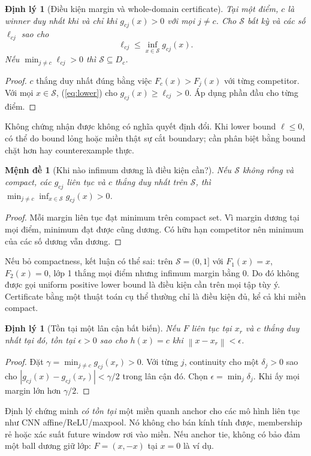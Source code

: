 \documentclass[11pt,a4paper]{article}
\newcommand{\norm}[1]{\left\lVert #1\right\rVert}
\newcommand{\Sset}{\mathcal S}
\newtheorem{theorem}[definition]{Định lý}
\newtheorem{proposition}[definition]{Mệnh đề}
\theoremstyle{remark}
\begin{document}
\begin{theorem}[Điều kiện margin và whole-domain certificate]
\label{th:margin}
Tại một điểm, $c$ là winner duy nhất khi và chỉ khi $g_{cj}(x)>0$ với mọi
$j\ne c$. Cho $\Sset$ bất kỳ và các số $\ell_{cj}$ sao cho
\begin{equation}
 \ell_{cj}\le\inf_{x\in\Sset}g_{cj}(x).
 \label{eq:lower}
\end{equation}
Nếu $\min_{j\ne c}\ell_{cj}>0$ thì $\Sset\subseteq D_c$.
\end{theorem}
\begin{proof}
$c$ thắng duy nhất đúng bằng việc $F_c(x)>F_j(x)$ với từng competitor.
Với mọi $x\in\Sset$, (\ref{eq:lower}) cho
$g_{cj}(x)\ge\ell_{cj}>0$. Áp dụng phần đầu cho từng điểm.
\end{proof}
Không chứng nhận được không có nghĩa quyết định đổi. Khi lower bound
$\ell\le0$, có thể do bound lỏng hoặc miền thật sự cắt boundary; cần phân
biệt bằng bound chặt hơn hay counterexample thực.

\begin{proposition}[Khi nào infimum dương là điều kiện cần?]
Nếu $\Sset$ không rỗng và compact, các $g_{cj}$ liên tục và $c$ thắng duy nhất trên
$\Sset$, thì $\min_{j\ne c}\inf_{x\in\Sset}g_{cj}(x)>0$.
\end{proposition}
\begin{proof}
Mỗi margin liên tục đạt minimum trên compact set. Vì margin dương tại mọi
điểm, minimum đạt được cũng dương. Có hữu hạn competitor nên minimum của
các số dương vẫn dương.
\end{proof}
Nếu bỏ compactness, kết luận có thể sai: trên $\Sset=(0,1]$ với
$F_1(x)=x$, $F_2(x)=0$, lớp 1 thắng mọi điểm nhưng infimum margin bằng 0.
Do đó không được gọi uniform positive lower bound là điều kiện cần trên
mọi tập tùy ý. Certificate bằng một thuật toán cụ thể thường chỉ là điều
kiện đủ, kể cả khi miền compact.

\begin{theorem}[Tồn tại một lân cận bất biến]\label{th:exist}
Nếu $F$ liên tục tại $x_r$ và $c$ thắng duy nhất tại đó, tồn tại
$\epsilon>0$ sao cho $h(x)=c$ khi $\norm{x-x_r}<\epsilon$.
\end{theorem}
\begin{proof}
Đặt $\gamma=\min_{j\ne c}g_{cj}(x_r)>0$. Với từng $j$, continuity cho một
$\delta_j>0$ sao cho $|g_{cj}(x)-g_{cj}(x_r)|<\gamma/2$ trong lân cận đó.
Chọn $\epsilon=\min_j\delta_j$. Khi ấy mọi margin lớn hơn $\gamma/2$.
\end{proof}
Định lý chứng minh \emph{có tồn tại} một miền quanh anchor cho các mô hình
liên tục như CNN affine/ReLU/maxpool. Nó không cho bán kính tính được,
membership rẻ hoặc xác suất future window rơi vào miền. Nếu anchor tie,
không có bảo đảm một ball dương giữ lớp: $F=(x,-x)$ tại $x=0$ là ví dụ.
\end{document}
